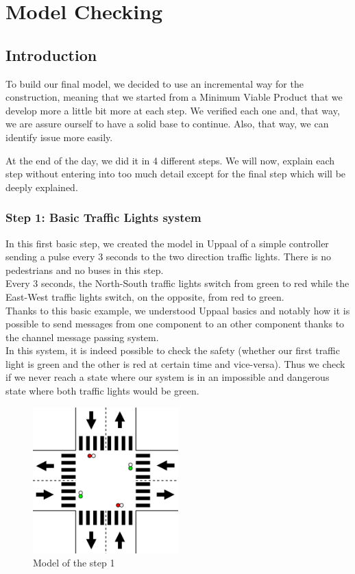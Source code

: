 \section{Model Checking}
\subsection{Introduction}
To build our final model, we decided to use an incremental way for the construction, meaning that we started from a Minimum Viable Product that we develop more a little bit more at each step. We  verified each one and, that way, we are assure ourself to have a solid base to continue. Also, that way, we can identify issue more easily.

At the end of the day, we did it in 4 different steps. We will now, explain each step without entering into too much detail except for the final step which will be deeply explained.

\subsubsection{Step 1: Basic Traffic Lights system}
In this first basic step, we created the model in Uppaal of a simple controller sending a pulse every 3 seconds to the two direction traffic lights. There is no pedestrians and no buses in this step. \\
Every 3 seconds, the North-South traffic lights switch from green to red while the East-West traffic lights switch, on the opposite, from red to green. \\

Thanks to this basic example, we understood Uppaal basics and notably how it is possible to send messages from one component to an other component thanks to the channel message passing system. \\

In this system, it is indeed possible to check the safety (whether our first traffic light is green and the other is red at certain time and vice-versa). Thus we check if we never reach a state where our system is in an impossible and dangerous state where both traffic lights would be green.


\begin{figure}[H]\label{fig:step1}
  \centering
    \includegraphics[width=0.5\textwidth]{picture/model/trafficlight_step1_s1.png}
    \caption{Model of the step 1}
\end{figure}


